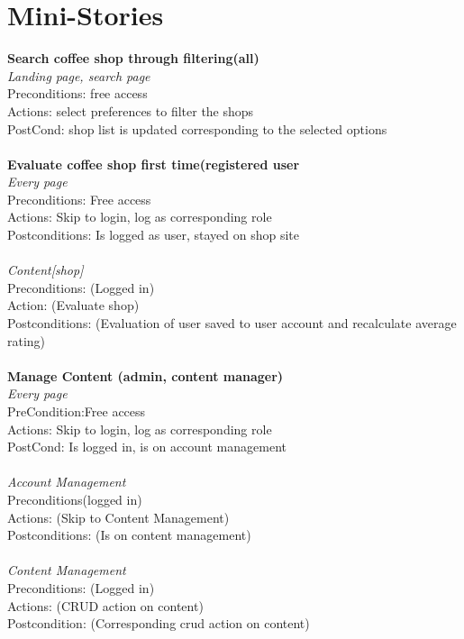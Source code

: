 \section{Mini-Stories}

\textbf{Search coffee shop through filtering(all)}\\
{\textit{Landing page, search page}}\\
Preconditions: {free access}\\
Actions: {select preferences to filter the shops}\\
PostCond: {shop list is updated corresponding to the selected options}\\\\
\textbf{Evaluate coffee shop first time(registered user}\\
{\textit{Every page}}\\
Preconditions: {Free access}\\
Actions: {Skip to login, log as corresponding role}\\
Postconditions: {Is logged as user, stayed on shop site}\\\\
{\textit{Content[shop]}}\\
Preconditions: (Logged in)\\
Action: (Evaluate shop)\\
Postconditions: (Evaluation of user saved to user account and recalculate average rating)\\\\
\textbf{Manage Content (admin, content manager)}\\
{\textit{Every page}}\\
PreCondition:{Free access}\\
Actions: {Skip to login, log as corresponding role}\\
PostCond: {Is logged in, is on account management}\\\\
{\textit{Account Management}}\\
Preconditions(logged in)\\
Actions: (Skip to Content Management)\\ 
Postconditions: (Is on content management)\\\\
{\textit{Content Management}}\\
Preconditions: (Logged in)\\
Actions: (CRUD action on content)\\
Postcondition: (Corresponding crud action on content)\\



